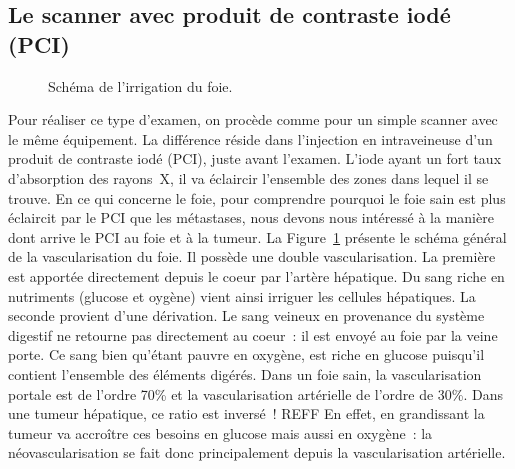 \documentclass[main.tex]{subfiles}
\begin{document}
\subsection{Le scanner avec produit de contraste iodé (PCI)}
\begin{figure}[h]
\centering
\vspace{-10mm}
\scalebox{.7}{}
\caption{\label{fig:schema_irrig_foie} Schéma de l'irrigation du foie.}
\vspace{-10mm}
\end{figure}
Pour réaliser ce type d'examen, on procède comme pour un simple scanner avec le même équipement. La différence réside dans l'injection en intraveineuse d'un produit de contraste iodé (PCI), juste avant l'examen. L'iode ayant un fort taux d'absorption des rayons~X, il va éclaircir l'ensemble des zones dans lequel il se trouve. En ce qui concerne le foie, pour comprendre pourquoi le foie sain est plus éclaircit par le PCI que les métastases, nous devons nous intéressé à la manière dont arrive le PCI au foie et à la tumeur. La Figure~\ref{fig:schema_irrig_foie} présente le schéma général de la vascularisation du foie. Il possède une double vascularisation. La première est apportée directement depuis le coeur par l'artère hépatique. Du sang riche en nutriments (glucose et oygène) vient ainsi irriguer les cellules hépatiques. La seconde provient d'une dérivation. Le sang veineux en provenance du système digestif ne retourne pas directement au coeur~: il est envoyé au foie par la veine porte. Ce sang bien qu'étant pauvre en oxygène, est riche en glucose puisqu'il contient l'ensemble des éléments digérés. Dans un foie sain, la vascularisation portale est de l'ordre 70\% et la vascularisation artérielle de l'ordre de 30\%. Dans une tumeur hépatique, ce ratio est inversé~! REFF En effet, en grandissant la tumeur va accroître ces besoins en glucose mais aussi en oxygène~: la néovascularisation se fait donc principalement depuis la vascularisation artérielle. 
\end{document}
